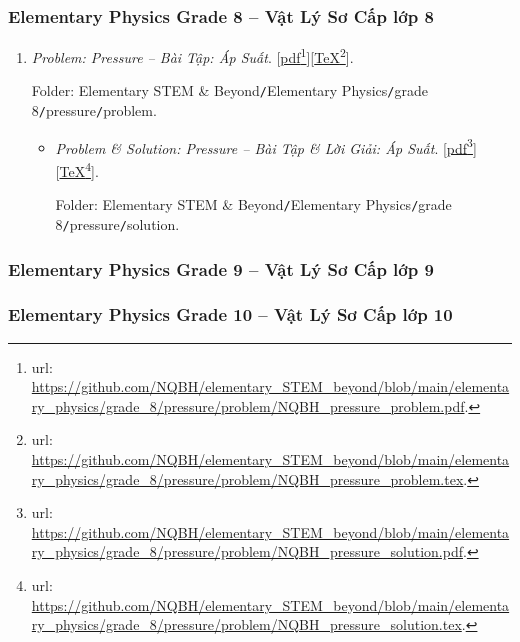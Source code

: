 \documentclass[12pt,twoside]{book}
\begin{document}
\subsubsection{Elementary Physics Grade 8 -- Vật Lý Sơ Cấp lớp 8}

\begin{enumerate}
	\item {\it Problem: Pressure -- Bài Tập: Áp Suất}. [\href{https://github.com/NQBH/elementary_STEM_beyond/blob/main/elementary_physics/grade_8/pressure/problem/NQBH_pressure_problem.pdf}{pdf}\footnote{{\sc url}: \url{https://github.com/NQBH/elementary_STEM_beyond/blob/main/elementary_physics/grade_8/pressure/problem/NQBH_pressure_problem.pdf}.}][\href{https://github.com/NQBH/elementary_STEM_beyond/blob/main/elementary_physics/grade_8/pressure/problem/NQBH_pressure_problem.tex}{\TeX}\footnote{{\sc url}: \url{https://github.com/NQBH/elementary_STEM_beyond/blob/main/elementary_physics/grade_8/pressure/problem/NQBH_pressure_problem.tex}.}].
	
	Folder: {\sf Elementary STEM \& Beyond{\tt/}Elementary Physics{\tt/}grade 8{\tt/}pressure{\tt/}problem}.
	\begin{itemize}
		\item {\it Problem \& Solution: Pressure -- Bài Tập \& Lời Giải: Áp Suất}. [\href{https://github.com/NQBH/elementary_STEM_beyond/blob/main/elementary_physics/grade_8/pressure/problem/NQBH_pressure_solution.pdf}{pdf}\footnote{{\sc url}: \url{https://github.com/NQBH/elementary_STEM_beyond/blob/main/elementary_physics/grade_8/pressure/problem/NQBH_pressure_solution.pdf}.}][\href{https://github.com/NQBH/elementary_STEM_beyond/blob/main/elementary_physics/grade_8/pressure/problem/NQBH_pressure_solution.tex}{\TeX}\footnote{{\sc url}: \url{https://github.com/NQBH/elementary_STEM_beyond/blob/main/elementary_physics/grade_8/pressure/problem/NQBH_pressure_solution.tex}.}].
		
		Folder: {\sf Elementary STEM \& Beyond{\tt/}Elementary Physics{\tt/}grade 8{\tt/}pressure{\tt/}solution}.
	\end{itemize}
\end{enumerate}

\subsubsection{Elementary Physics Grade 9 -- Vật Lý Sơ Cấp lớp 9}

\subsubsection{Elementary Physics Grade 10 -- Vật Lý Sơ Cấp lớp 10}
\end{document}
